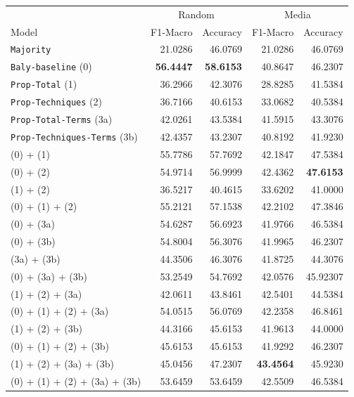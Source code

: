 \begin{table}[!htbp]
    \centering
   \scriptsize
    \begin{tabular}{l|rr|rr}
        & \multicolumn{2}{c}{Random} & \multicolumn{2}{c}{Media} \\
        Model & F1-Macro & Accuracy & F1-Macro & Accuracy \\
        \hline
        \texttt{Majority} & 21.0286 & 46.0769 & 21.0286 & 46.0769 \\
        \texttt{Baly-baseline} (0) & \textbf{56.4447} & \textbf{58.6153} & 40.8647 & 46.2307 \\
        \hline
        \texttt{Prop-Total} (1) & 36.2966 & 42.3076 & 28.8285 & 41.5384 \\
        \texttt{Prop-Techniques} (2) & 36.7166 & 40.6153 & 33.0682 & 40.5384 \\
        \texttt{Prop-Total-Terms} (3a) & 42.0261 & 43.5384 & 41.5915 & 43.3076 \\
        \texttt{Prop-Techniques-Terms} (3b) & 42.4357 & 43.2307 & 40.8192 & 41.9230 \\
        \hline
        (0) + (1) & 55.7786 & 57.7692 & 42.1847 & 47.5384 \\
        (0) + (2) & 54.9714 & 56.9999 & 42.4362 & \textbf{47.6153} \\
        (1) + (2) & 36.5217 & 40.4615 & 33.6202 & 41.0000 \\
        (0) + (1) + (2) & 55.2121 & 57.1538 & 42.2102 & 47.3846 \\
        (0) + (3a) & 54.6287 & 56.6923 & 41.9766 & 46.5384 \\
        (0) + (3b) & 54.8004 & 56.3076 & 41.9965 & 46.2307 \\
        (3a) + (3b) & 44.3506 & 46.3076 & 41.8725 & 44.3076 \\
        (0) + (3a) + (3b) & 53.2549 & 54.7692 & 42.0576 & 45.92307 \\
        (1) + (2) + (3a) & 42.0611 & 43.8461 & 42.5401 & 44.5384 \\
        (0) + (1) + (2) + (3a) & 54.0515 & 56.0769 & 42.2358 & 46.8461 \\
        (1) + (2) + (3b) & 44.3166 & 45.6153 & 41.9613 & 44.0000 \\
        (0) + (1) + (2) + (3b) & 45.6153 & 45.6153 & 41.9292 & 46.2307 \\
        (1) + (2) + (3a) + (3b) & 45.0456 & 47.2307 & \textbf{43.4564} & 45.9230 \\
        (0) + (1) + (2) + (3a) + (3b) & 53.6459 & 53.6459 & 42.5509 & 46.5384 \\
        

\end{tabular}
\end{table}
